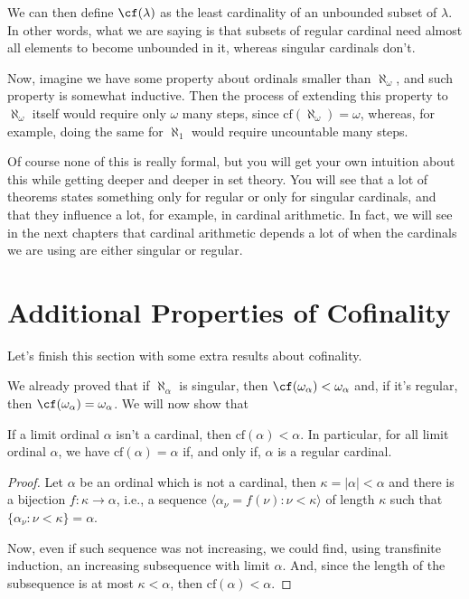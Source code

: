 We can then define $\cf(\lambda)$ as the least cardinality of an unbounded subset of $\lambda$. In other words, what we are saying is that subsets of regular cardinal need almost all elements to become unbounded in it, whereas singular cardinals don't.

Now, imagine we have some property about ordinals smaller than $\aleph_\omega$, and such property is somewhat inductive. Then the process of extending this property to $\aleph_\omega$ itself would require only $\omega$ many steps, since $\text{cf}(\aleph_\omega)=\omega$, whereas, for example, doing the same for $\aleph_1$ would require uncountable many steps.

Of course none of this is really formal, but you will get your own intuition about this while getting deeper and deeper in set theory. You will see that a lot of theorems states something only for regular or only for singular cardinals, and that they influence a lot, for example, in cardinal arithmetic. In fact, we will see in the next chapters that cardinal arithmetic depends a lot of when the cardinals we are using are either singular or regular.

\section{Additional Properties of Cofinality}

Let's finish this section with some extra results about cofinality.

We already proved that if $\aleph_\alpha$ is singular, then $\cf(\omega_\alpha)<\omega_\alpha$ and, if it's regular, then $\cf(\omega_\alpha)=\omega_\alpha$. We will now show that

\begin{lemma}{}{}
    If a limit ordinal $\alpha$ isn't a cardinal, then $\text{cf}(\alpha)<\alpha$. In particular, for all limit ordinal $\alpha$, we have $\text{cf}(\alpha)=\alpha$ if, and only if, $\alpha$ is a regular cardinal.
\end{lemma}

\begin{proof}
    Let $\alpha$ be an ordinal which is not a cardinal, then $\kappa=\lvert\alpha\rvert<\alpha$ and there is a bijection $f:\kappa\to\alpha$, i.e., a sequence $\langle\alpha_\nu=f(\nu):\nu<\kappa\rangle$ of length $\kappa$ such that $\{\alpha_\nu:\nu<\kappa\}=\alpha$.

    Now, even if such sequence was not increasing, we could find, using transfinite induction, an increasing subsequence with limit $\alpha$. And, since the length of the subsequence is at most $\kappa<\alpha$, then $\text{cf}(\alpha)<\alpha$.
\end{proof}

